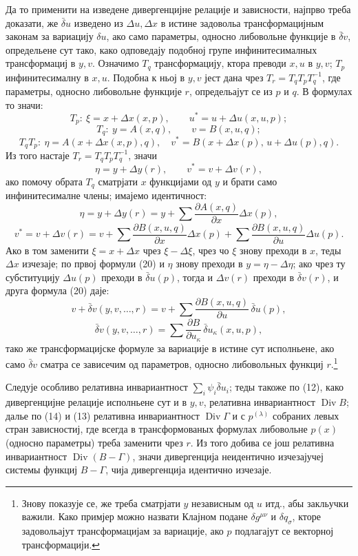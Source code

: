 ﻿\documentclass[11pt]{article}
\providecommand{\D}{\Delta}
\providecommand{\p}{\partial}
\DeclareMathOperator{\Div}{Div}
\providecommand{\bd}{\bar{\delta}}
\begin{document}
Да то применити на изведене дивергенцијне релације и зависности, најпрво треба доказати, же \(\bd u\) изведено из \(\D u,\D x\) в истине задовольа трансформацијным законам за вариацију \(\delta u\), ако само параметры, односно либовольне функције в \(\bd v\), определьене сут тако, како одповедају подобној групе инфинитесималных трансформациј в \(y,v\). Означимо \(T_q\) трансформацију, ктора преводи \(x,u\) в \(y,v\); \(T_p\) инфинитесималну в \(x,u\). Подобна к ньој в \(y,v\) јест дана чрез \(T_r=T_qT_pT_q^{-1}\), где параметры, односно либовольне функције \(r\), определьајут се из \(p\) и \(q\). В формулах то значи:
\[
T_p:\ \xi=x+\D x(x,p),\qquad u^*=u+\D u(x,u,p);
\]
\[
T_q:\ y=A(x,q),\qquad v=B(x,u,q);
\]
\[
T_qT_p:\ \eta=A(x+\D x(x,p),q),\quad
v^*=B(x+\D x(p),\,u+\D u(p),q).
\]
Из того настаје \(T_r=T_qT_pT_q^{-1}\), значи
\[
\eta=y+\D y(r),\qquad v^*=v+\D v(r),
\]
ако помочу обрата \(T_q\) сматрјати \(x\) функцијами од \(y\) и брати само инфинитесималне члены; имајемо идентичност:
\begin{equation}
\eta=y+\D y(r)=y+\sum\frac{\p A(x,q)}{\p x}\D x(p),
\tag{20a}
\end{equation}
\begin{equation}
v^*=v+\D v(r)=v+\sum\frac{\p B(x,u,q)}{\p x}\D x(p)
+\sum\frac{\p B(x,u,q)}{\p u}\D u(p).
\tag{20b}
\end{equation}
Ако в том заменити \(\xi=x+\D x\) чрез \(\xi-\D \xi\), чрез чо \(\xi\) знову преходи в \(x\), теды \(\D x\) изчезаје; по првој формули (20) и \(\eta\) знову преходи в \(y=\eta-\D\eta\); ако чрез ту субституцију \(\D u(p)\) преходи в \(\bd u(p)\), тогда и \(\D v(r)\) преходи в \(\bd v(r)\), и друга формула (20) даје:
\[
v+\bd v(y,v,\ldots,r)=v+\sum\frac{\p B(x,u,q)}{\p u}\,\bd u(p),
\]
\[
\bd v(y,v,\ldots,r)=\sum\frac{\p B}{\p u_\kappa}\,\bd u_\kappa(x,u,p),
\]
тако же трансформацијске формуле за вариације в истине сут исполньене, ако само \(\bd v\) сматра се зависечим од параметров, односно либовольных функциј \(r\).\footnote{Знову показује се, же треба сматрјати \(y\) независным од \(u\) итд., абы закльучки важили. Како примјер можно назвати Клајном подане \(\delta g^{\mu\nu}\) и \(\delta q_\sigma\), кторе задовольајут трансформацијам за вариације, ако \(p\) подлагајут се векторној трансформацији.}

Следује особливо релативна инвариантност \(\sum_i\psi_i\bd u_i\); теды такоже по (12), како дивергенцијне релације исполньене сут и в \(y,v\), релативна инвариантност \(\Div B\); далье по (14) и (13) релативна инвариантност \(\Div\Gamma\) и с \(p^{(\lambda)}\) собраних левых стран зависностиј, где всегда в трансформованых формулах либовольне \(p(x)\) (односно параметры) треба заменити чрез \(r\). Из того добива се још релативна инвариантност \(\Div(B-\Gamma)\), значи дивергенција неидентично изчезајучеј системы функциј \(B-\Gamma\), чија дивергенција идентично изчезаје.
\end{document}
